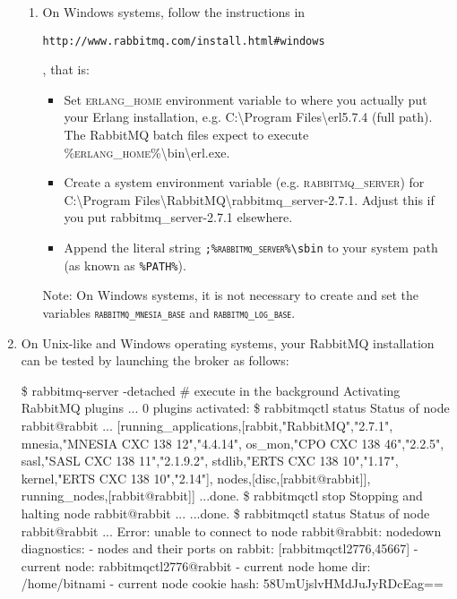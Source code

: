 \begin{enumerate}
\begin{enumerate}
\item On Windows systems, follow the instructions in \begin{small}\texttt{http://\-www.\-rabbitmq.\-com/\-install.\-html\#\-windows}\end{small}, that is:
\begin{itemize}
\item Set \textsf{\textsc{erlang\_home}} environment variable to where
  you actually put your Erlang installation,
  e.g. \textsf{C:\textbackslash{}Program
    Files\textbackslash{}erl5.7.4} (full path). The \textsf{RabbitMQ}
  batch files expect to execute
  \textsf{\textsc{\%erlang\_home}\%\textbackslash{}bin\textbackslash{}erl.exe}.
\item Create a system environment variable
  (e.g. \textsf{\textsc{rabbitmq\_server}}) for
  \textsf{C:\textbackslash{}Program
    Files\textbackslash{}RabbitMQ\textbackslash{}rabbitmq\_server-2.7.1}.
  Adjust this if you put \textsf{rabbitmq\_server-2.7.1} elsewhere.
\item Append the literal string
  \texttt{;\textsc{\%rabbitmq\_server}\%\textbackslash{}sbin} to your
  system path (as known as \texttt{\%PATH\%}).
\end{itemize}
Note: On Windows systems, it is not necessary to create and set the
variables \texttt{\textsc{rabbitmq\_mnesia\_base}} and
\texttt{\textsc{rabbitmq\_log\_base}}.
\end{enumerate}

\item
On Unix-like and Windows operating systems, your \textsf{RabbitMQ}
installation can be tested by launching the broker as follows:
\begin{shellcmd}
\$ rabbitmq-server -detached \# execute in the background
Activating RabbitMQ plugins ...
0 plugins activated:
\$ rabbitmqctl status
Status of node rabbit@rabbit ...
[{running\_applications,[{rabbit,"RabbitMQ","2.7.1"},
                        {mnesia,"MNESIA  CXC 138 12","4.4.14"},
                        {os\_mon,"CPO  CXC 138 46","2.2.5"},
                        {sasl,"SASL  CXC 138 11","2.1.9.2"},
                        {stdlib,"ERTS  CXC 138 10","1.17"},
                        {kernel,"ERTS  CXC 138 10","2.14"}]},
 {nodes,[{disc,[rabbit@rabbit]}]},
 {running\_nodes,[rabbit@rabbit]}]
...done.
\$ rabbitmqctl stop
Stopping and halting node rabbit@rabbit ...
...done.
\$ rabbitmqctl status
Status of node rabbit@rabbit ...
Error: unable to connect to node rabbit@rabbit: nodedown
diagnostics:
- nodes and their ports on rabbit: [{rabbitmqctl2776,45667}]
- current node: rabbitmqctl2776@rabbit
- current node home dir: /home/bitnami
- current node cookie hash: 58UmUjslvHMdJuJyRDcEag==
\end{shellcmd}
\end{enumerate}

